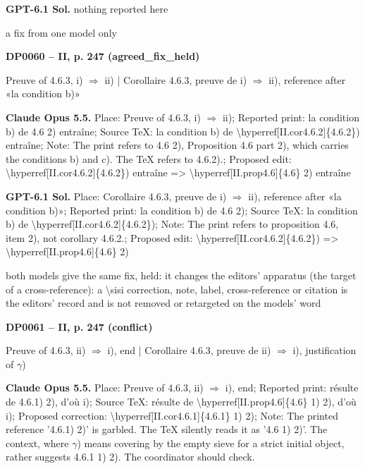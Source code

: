\textbf{GPT-6.1 Sol.} nothing reported here\par
a fix from one model only\par
\par\noindent\hypertarget{DP0060}{}\textbf{DP0060 -- II, p. 247 (agreed\_fix\_held)}\par
Preuve of 4.6.3, i) \ensuremath{\Rightarrow} ii) | Corollaire 4.6.3, preuve de i) \ensuremath{\Rightarrow} ii), reference after «la condition b)»\par
\textbf{Claude Opus 5.5.} Place: Preuve of 4.6.3, i) \ensuremath{\Rightarrow} ii); Reported print: la condition b) de 4.6 2) entraîne; Source TeX: la condition b) de \textbackslash{}hyperref[II.cor4.6.2]\{4.6.2\}) entraîne; Note: The print refers to 4.6 2), Proposition 4.6 part 2), which carries the conditions b) and c). The TeX refers to 4.6.2).; Proposed edit: \textbackslash{}hyperref[II.cor4.6.2]\{4.6.2\}) entraîne =\allowbreak > \textbackslash{}hyperref[II.prop4.6]\{4.6\} 2) entraîne\par
\textbf{GPT-6.1 Sol.} Place: Corollaire 4.6.3, preuve de i) \ensuremath{\Rightarrow} ii), reference after «la condition b)»; Reported print: la condition b) de 4.6 2); Source TeX: la condition b) de \textbackslash{}hyperref[II.cor4.6.2]\{4.6.2\}); Note: The print refers to proposition 4.6, item 2), not corollary 4.6.2.; Proposed edit: \textbackslash{}hyperref[II.cor4.6.2]\{4.6.2\}) =\allowbreak > \textbackslash{}hyperref[II.prop4.6]\{4.6\} 2)\par
both models give the same fix, held: it changes the editors' apparatus (the target of a cross-reference): a \textbackslash{}sisi correction, note, label, cross-reference or citation is the editors' record and is not removed or retargeted on the models' word\par
\par\noindent\hypertarget{DP0061}{}\textbf{DP0061 -- II, p. 247 (conflict)}\par
Preuve of 4.6.3, ii) \ensuremath{\Rightarrow} i), end | Corollaire 4.6.3, preuve de ii) \ensuremath{\Rightarrow} i), justification of \ensuremath{\gamma})\par
\textbf{Claude Opus 5.5.} Place: Preuve of 4.6.3, ii) \ensuremath{\Rightarrow} i), end; Reported print: résulte de 4.6.1) 2), d'où i); Source TeX: résulte de \textbackslash{}hyperref[II.prop4.6]\{4.6\} 1) 2), d'où i); Proposed correction: \textbackslash{}hyperref[II.cor4.6.1]\{4.6.1\} 1) 2); Note: The printed reference '4.6.1) 2)' is garbled. The TeX silently reads it as '4.6 1) 2)'. The context, where \ensuremath{\gamma}) means covering by the empty sieve for a strict initial object, rather suggests 4.6.1 1) 2). The coordinator should check.\par
